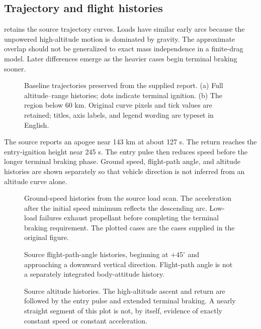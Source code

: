 \documentclass[11pt,a4paper]{article}
\begin{document}
\subsection{Trajectory and flight histories}
 retains the source trajectory curves. Loads have similar early arcs because the unpowered high-altitude motion is dominated by gravity. The approximate overlap should not be generalized to exact mass independence in a finite-drag model. Later differences emerge as the heavier cases begin terminal braking sooner.

\begin{figure}[htbp]
\centering\SourceTrajectory
\caption{Baseline trajectories preserved from the supplied report. (a) Full altitude--range histories; dots indicate terminal ignition. (b) The region below 60 km. Original curve pixels and tick values are retained; titles, axis labels, and legend wording are typeset in English.}
\label{fig:trajectory}
\end{figure}

The source reports an apogee near 143 km at about 127 s. The return reaches the entry-ignition height near 245 s. The entry pulse then reduces speed before the longer terminal braking phase. Ground speed, flight-path angle, and altitude histories are shown separately so that vehicle direction is not inferred from an altitude curve alone.

\begin{figure}[htbp]
\centering{}
\caption{Ground-speed histories from the source load scan. The acceleration after the initial speed minimum reflects the descending arc. Low-load failures exhaust propellant before completing the terminal braking requirement. The plotted cases are the cases supplied in the original figure.}
\label{fig:speed}
\end{figure}

\begin{figure}[htbp]
\centering{}
\caption{Source flight-path-angle histories, beginning at $+45^\circ$ and approaching a downward vertical direction. Flight-path angle is not a separately integrated body-attitude history.}
\label{fig:gamma}
\end{figure}

\begin{figure}[htbp]
\centering{}
\caption{Source altitude histories. The high-altitude ascent and return are followed by the entry pulse and extended terminal braking. A nearly straight segment of this plot is not, by itself, evidence of exactly constant speed or constant acceleration.}
\label{fig:height}
\end{figure}
\end{document}
